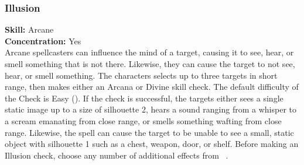 \subsubsection{Illusion}
\textbf{Skill:} Arcane\\
\textbf{Concentration:} Yes\\
Arcane spellcasters can influence the mind of a target, causing
it to see, hear, or smell something that is not there. Likewise, they can cause
the target to not see, hear, or smell something.  The characters selects up to
three targets in short range, then makes either an Arcana or Divine skill check.
The default difficulty of the Check is Easy (\difficulty). If the check is successful,
the targets either sees a single static image up to a size of silhouette 2, hears
a sound ranging from a whisper to a scream emanating from close range, or smells
something wafting from close range. Likewise, the spell can cause the target to
be unable to see a small, static object with silhouette 1 such as a chest, weapon,
door, or shelf. Before making an Illusion check, choose any number of additional
effects from ~.

